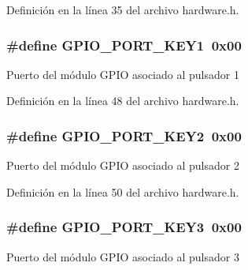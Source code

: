 Definición en la línea 35 del archivo hardware.\+h.

\subsubsection[{\texorpdfstring{G\+P\+I\+O\+\_\+\+P\+O\+R\+T\+\_\+\+K\+E\+Y1}{GPIO_PORT_KEY1}}]{\setlength{\rightskip}{0pt plus 5cm}\#define G\+P\+I\+O\+\_\+\+P\+O\+R\+T\+\_\+\+K\+E\+Y1~0x00}\hypertarget{group__hardware_gabce59bc33538c850842e408765ae4981}{}\label{group__hardware_gabce59bc33538c850842e408765ae4981}
Puerto del módulo G\+P\+IO asociado al pulsador 1 

Definición en la línea 48 del archivo hardware.\+h.

\subsubsection[{\texorpdfstring{G\+P\+I\+O\+\_\+\+P\+O\+R\+T\+\_\+\+K\+E\+Y2}{GPIO_PORT_KEY2}}]{\setlength{\rightskip}{0pt plus 5cm}\#define G\+P\+I\+O\+\_\+\+P\+O\+R\+T\+\_\+\+K\+E\+Y2~0x00}\hypertarget{group__hardware_gaeaf62bdfcf5fc1fe75d98d961286be78}{}\label{group__hardware_gaeaf62bdfcf5fc1fe75d98d961286be78}
Puerto del módulo G\+P\+IO asociado al pulsador 2 

Definición en la línea 50 del archivo hardware.\+h.

\subsubsection[{\texorpdfstring{G\+P\+I\+O\+\_\+\+P\+O\+R\+T\+\_\+\+K\+E\+Y3}{GPIO_PORT_KEY3}}]{\setlength{\rightskip}{0pt plus 5cm}\#define G\+P\+I\+O\+\_\+\+P\+O\+R\+T\+\_\+\+K\+E\+Y3~0x00}\hypertarget{group__hardware_ga6e75308c8b20c3236d0449a07bb052f7}{}\label{group__hardware_ga6e75308c8b20c3236d0449a07bb052f7}
Puerto del módulo G\+P\+IO asociado al pulsador 3 

